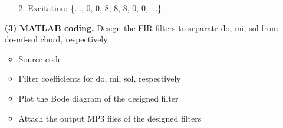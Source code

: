 \documentclass[a4paper, 12pt]{article}
\begin{document}
\begin{itemize}
\begin{itemize}
\item[2.]{Excitation: \{..., 0, 0, 8, 8, 8, 0, 0, ...\}}

\begin{figure}[h!]
\end{figure}

\pagebreak

\begin{figure}[h!]
\end{figure}
\end{itemize}

\item[\textbf{(3)}]{\textbf{MATLAB coding.}}
Design the FIR filters to separate do, mi, sol from do-mi-sol chord, respectively.
\begin{itemize}
\item{Source code}
\item{Filter coefficients for do, mi, sol, respectively}
\item{Plot the Bode diagram of the designed filter}
\item{Attach the output MP3 files of the designed filters}
\end{itemize}


\end{itemize}
\end{document}
